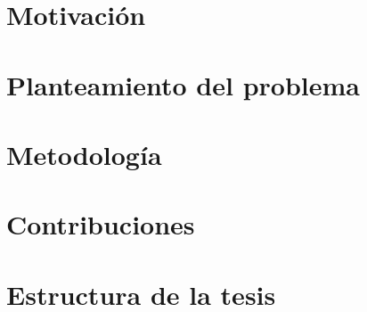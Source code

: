 \section{Motivación}


\section{Planteamiento del problema}


\section{Metodología} 



\section{Contribuciones} %



\section{Estructura de la tesis} %


